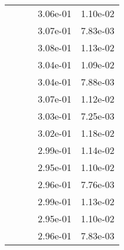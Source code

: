 \begin{table}
\begin{tabular}{c|cc|cc|}
\multicolumn{1}{|c|}{} & \multicolumn{1}{|c|}{} & \multicolumn{1}{|c|}{} & \multicolumn{1}{|c|}{  3.06e-01} & \multicolumn{1}{|c|}{  1.10e-02} \\ 
\multicolumn{1}{|c|}{} & \multicolumn{1}{|c|}{} & \multicolumn{1}{|c|}{} & \multicolumn{1}{|c|}{  3.07e-01} & \multicolumn{1}{|c|}{  7.83e-03} \\ 
\multicolumn{1}{|c|}{} & \multicolumn{1}{|c|}{} & \multicolumn{1}{|c|}{} & \multicolumn{1}{|c|}{  3.08e-01} & \multicolumn{1}{|c|}{  1.13e-02} \\ 
\multicolumn{1}{|c|}{} & \multicolumn{1}{|c|}{} & \multicolumn{1}{|c|}{} & \multicolumn{1}{|c|}{  3.04e-01} & \multicolumn{1}{|c|}{  1.09e-02} \\ 
\multicolumn{1}{|c|}{} & \multicolumn{1}{|c|}{} & \multicolumn{1}{|c|}{} & \multicolumn{1}{|c|}{  3.04e-01} & \multicolumn{1}{|c|}{  7.88e-03} \\ 
\multicolumn{1}{|c|}{} & \multicolumn{1}{|c|}{} & \multicolumn{1}{|c|}{} & \multicolumn{1}{|c|}{  3.07e-01} & \multicolumn{1}{|c|}{  1.12e-02} \\ 
\multicolumn{1}{|c|}{} & \multicolumn{1}{|c|}{} & \multicolumn{1}{|c|}{} & \multicolumn{1}{|c|}{  3.03e-01} & \multicolumn{1}{|c|}{  7.25e-03} \\ 
\multicolumn{1}{|c|}{} & \multicolumn{1}{|c|}{} & \multicolumn{1}{|c|}{} & \multicolumn{1}{|c|}{  3.02e-01} & \multicolumn{1}{|c|}{  1.18e-02} \\ 
\multicolumn{1}{|c|}{} & \multicolumn{1}{|c|}{} & \multicolumn{1}{|c|}{} & \multicolumn{1}{|c|}{  2.99e-01} & \multicolumn{1}{|c|}{  1.14e-02} \\ 
\multicolumn{1}{|c|}{} & \multicolumn{1}{|c|}{} & \multicolumn{1}{|c|}{} & \multicolumn{1}{|c|}{  2.95e-01} & \multicolumn{1}{|c|}{  1.10e-02} \\ 
\multicolumn{1}{|c|}{} & \multicolumn{1}{|c|}{} & \multicolumn{1}{|c|}{} & \multicolumn{1}{|c|}{  2.96e-01} & \multicolumn{1}{|c|}{  7.76e-03} \\ 
\multicolumn{1}{|c|}{} & \multicolumn{1}{|c|}{} & \multicolumn{1}{|c|}{} & \multicolumn{1}{|c|}{  2.99e-01} & \multicolumn{1}{|c|}{  1.13e-02} \\ 
\multicolumn{1}{|c|}{} & \multicolumn{1}{|c|}{} & \multicolumn{1}{|c|}{} & \multicolumn{1}{|c|}{  2.95e-01} & \multicolumn{1}{|c|}{  1.10e-02} \\ 
\multicolumn{1}{|c|}{} & \multicolumn{1}{|c|}{} & \multicolumn{1}{|c|}{} & \multicolumn{1}{|c|}{  2.96e-01} & \multicolumn{1}{|c|}{  7.83e-03} \\ 

\end{tabular}
\end{table}
